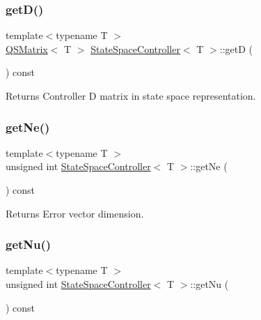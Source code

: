 \subsubsection{\texorpdfstring{get\+D()}{getD()}}
{\footnotesize\ttfamily template$<$typename T $>$ \\
\hyperlink{classQSMatrix}{Q\+S\+Matrix}$<$ T $>$ \hyperlink{classStateSpaceController}{State\+Space\+Controller}$<$ T $>$\+::getD (\begin{DoxyParamCaption}{ }\end{DoxyParamCaption}) const}

\begin{DoxyReturn}{Returns}
Controller D matrix in state space representation. 
\end{DoxyReturn}
\mbox{\label{classStateSpaceController_a0fac286142187799c135d236f389090d}} 
\subsubsection{\texorpdfstring{get\+Ne()}{getNe()}}
{\footnotesize\ttfamily template$<$typename T $>$ \\
unsigned int \hyperlink{classStateSpaceController}{State\+Space\+Controller}$<$ T $>$\+::get\+Ne (\begin{DoxyParamCaption}{ }\end{DoxyParamCaption}) const}

\begin{DoxyReturn}{Returns}
Error vector dimension. 
\end{DoxyReturn}
\mbox{\label{classStateSpaceController_a05e9deaeb91afc5e2a2009768e72850e}} 
\subsubsection{\texorpdfstring{get\+Nu()}{getNu()}}
{\footnotesize\ttfamily template$<$typename T $>$ \\
unsigned int \hyperlink{classStateSpaceController}{State\+Space\+Controller}$<$ T $>$\+::get\+Nu (\begin{DoxyParamCaption}{ }\end{DoxyParamCaption}) const}

